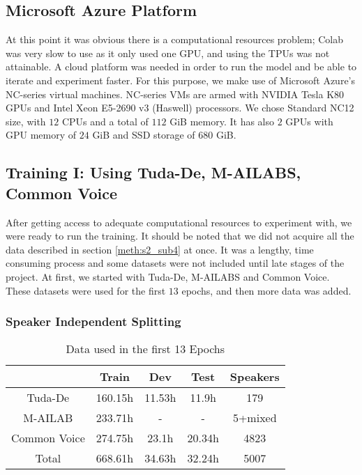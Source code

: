 
\subsection{Microsoft Azure Platform}
\label{meth:s4_sub2}

At this point it was obvious there is a computational resources problem; Colab was very slow to use as it only used one GPU, and using the \ac{TPU}s was not attainable. A cloud platform was needed in order to run the model and be able to iterate and experiment faster. For this purpose, we make use of Microsoft Azure's NC-series virtual machines. NC-series \ac{VM}s are armed with NVIDIA Tesla K80 GPUs and Intel Xeon E5-2690 v3 (Haswell) processors.
We chose Standard NC12 size, with $12$ CPUs and a total of $112$ GiB memory. It has also $2$ GPUs with GPU memory of $24$ GiB and SSD storage of $680$ GiB.



\subsection{Training I: Using Tuda-De, M-AILABS, Common Voice } 
\label{meth:s4_sub3}

After getting access to adequate computational resources to experiment with, we were ready to run the training. It should be noted that we did not acquire all the data described in section \ref{meth:s2_sub4} at once. It was a lengthy, time consuming process and some datasets were not included until late stages of the project. At first, we started with Tuda-De, M-AILABS and Common Voice. These datasets were used for the first $13$ epochs, and then more data was added.

\subsubsection{Speaker Independent Splitting}
\label{meth:s4_sub3_subsub1}

\begin{table}[!ht]
	\centering
	\begin{tabular}{ | c | c | c | c | c | } 
		\hline
		&   Train   &   Dev &   Test    &   Speakers \\ 
		\hline
		Tuda-De &   160.15h &   11.53h  &   11.9h   &   179 \\
		\hline
		M-AILAB &   233.71h &   -   &   -   &   5+mixed \\ 
		\hline
		Common Voice    &   274.75h &   23.1h   &   20.34h  &   4823 \\
		\hline
		Total   &   668.61h &   34.63h  &   32.24h  &   5007 \\
		\hline
	\end{tabular}
	\caption{Data used in the first 13 Epochs}
	\label{meth:table1}
\end{table}

